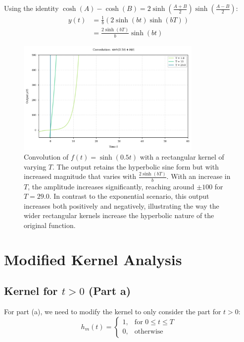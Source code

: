 \documentclass{article}
\begin{document}
	Using the identity $\cosh(A) - \cosh(B) = 2\sinh(\frac{A+B}{2})\sinh(\frac{A-B}{2})$:
	\begin{align}
		y(t) &= \frac{1}{b}(2\sinh(bt)\sinh(bT)) \\
		&= \frac{2\sinh(bT)}{b}\sinh(bt)
	\end{align}
	
	\begin{figure}[htbp]
		\centering
		\includegraphics[width=0.8\textwidth]{figs/hyper_convolution.png}
		\caption{Convolution of $f(t) = \sinh(0.5t)$ with a rectangular kernel of varying $T$. The output retains the hyperbolic sine form but with increased magnitude that varies with $\frac{2\sinh(bT)}{b}$. With an increase in $T$, the amplitude increases significantly, reaching around $\pm100$ for $T = 29.0$. In contrast to the exponential scenario, this output increases both positively and negatively, illustrating the way the wider rectangular kernels increase the hyperbolic nature of the original function.}
		\label{fig:hyper_convolution}
	\end{figure}
	
	\section{Modified Kernel Analysis}
	\subsection{Kernel for $t > 0$ (Part a)}
	For part (a), we need to modify the kernel to only consider the part for $t > 0$:
	\begin{equation}
		h_m(t) = 
		\begin{cases} 
			1, & \text{for } 0 \leq t \leq T \\
			0, & \text{otherwise}
		\end{cases}
	\end{equation}
	
\end{document}
